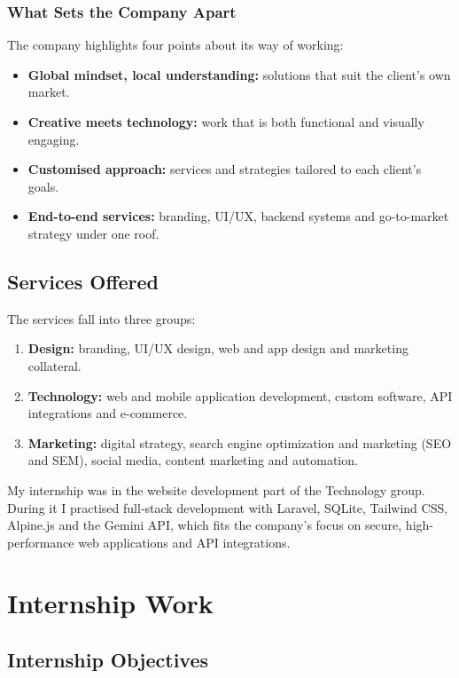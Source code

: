 \documentclass[12pt,a4paper]{report}
\begin{document}
\subsection{What Sets the Company Apart}\label{s221}
The company highlights four points about its way of working:
\begin{itemize}[leftmargin=*]
    \item \textbf{Global mindset, local understanding:} solutions that suit the client's own market.
    \item \textbf{Creative meets technology:} work that is both functional and visually engaging.
    \item \textbf{Customised approach:} services and strategies tailored to each client's goals.
    \item \textbf{End-to-end services:} branding, UI/UX, backend systems and go-to-market strategy under one roof.
\end{itemize}


\section{Services Offered}\label{s23}

The services fall into three groups:
\begin{enumerate}[leftmargin=*]
    \item \textbf{Design:} branding, UI/UX design, web and app design and marketing collateral.
    \item \textbf{Technology:} web and mobile application development, custom software, API integrations and e-commerce.
    \item \textbf{Marketing:} digital strategy, search engine optimization and marketing (SEO and SEM), social media, content marketing and automation.
\end{enumerate}

My internship was in the website development part of the Technology group. During it I practised full-stack development with Laravel, SQLite, Tailwind CSS, Alpine.js and the Gemini API, which fits the company's focus on secure, high-performance web applications and API integrations.


\chapter{Internship Work}\label{ch3}

\section{Internship Objectives}\label{s31}
\end{document}
